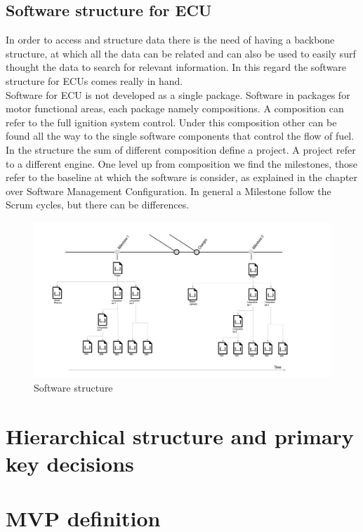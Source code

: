 \documentclass[../main.tex]{subfiles}
\begin{document}
\subsection{Software structure for ECU}
In order to access and structure data there is the need of having a backbone structure, at which all the data can be related and can also be used to easily surf thought the data to search for relevant information. In this regard the software structure for \gls{ECU}s comes really in hand.\\ 
Software for \gls{ECU} is not developed as a single package. Software in packages for motor functional areas, each package namely compositions. A composition can refer to the full ignition system control. Under this composition other can be found all the way to the single software components that control the flow of fuel.\\
In the structure the sum of different composition define a project. A project refer to a different engine. One level up from composition we find the milestones, those refer to the baseline at which the software is consider, as explained in the chapter over Software Management Configuration. In general a Milestone follow the Scrum cycles, but there can be differences. \\
\begin{figure}
    \centering
    \includegraphics[width=\linewidth]{images_folder/softwarestrucutre.png}
    \caption{Software structure}
    \label{fig:SWsTR}
\end{figure}
\section{Hierarchical structure and primary key decisions}
\section{MVP definition}
\end{document}
